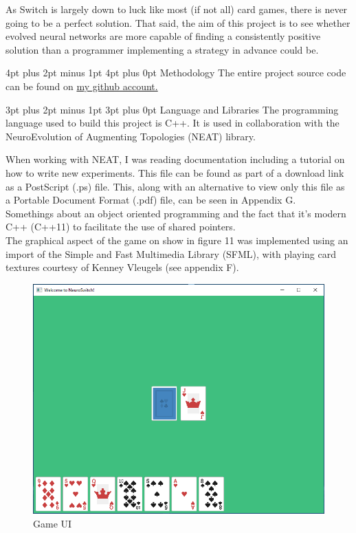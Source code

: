 \documentclass[12pt,a4paper]{article}
\makeatletter
\renewcommand\subsection{\@startsection {subsection}{1}{2mm} %
                               {3pt plus 2pt minus 1pt} %
                               {3pt plus 0pt} %
                               {\normalfont\bfseries}}
\renewcommand\section{\@startsection {section}{1}{0mm} %
                               {4pt plus 2pt minus 1pt} %
                               {4pt plus 0pt} %
                               {\bfseries}}
\makeatother
\begin{document}
As Switch is largely down to luck like most (if not all) card games, there is never going to be a perfect solution. That said, the aim of this project is to see whether evolved neural networks are more capable of finding a consistently positive solution than a programmer implementing a strategy in advance could be. 

\newpage
\section{Methodology}
The entire project source code can be found on \href{http://www.github.com/x4iiiis/honoursproject}{my github account.}


\subsection{Language and Libraries}
The programming language used to build this project is C++. It is used in collaboration with the NeuroEvolution of Augmenting Topologies (NEAT) library. 

When working with NEAT, I was reading documentation including a tutorial on how to write new experiments. This file can be found as part of a download link as a PostScript (.ps) file. This, along with an alternative to view only this file as a Portable Document Format (.pdf) file, can be seen in Appendix G.\\


Somethings about an object oriented programming and the fact that it's modern C++ (C++11) to facilitate the use of shared pointers. \\

The graphical aspect of the game on show in figure 11 was implemented using an import of the Simple and Fast Multimedia Library (SFML), with playing card textures courtesy of Kenney Vleugels (see appendix F).


\begin{figure}[h]
	\centering
	\includegraphics[width = \textwidth]{SFML.png}
	\caption{Game UI}
\end{figure}
\end{document}
